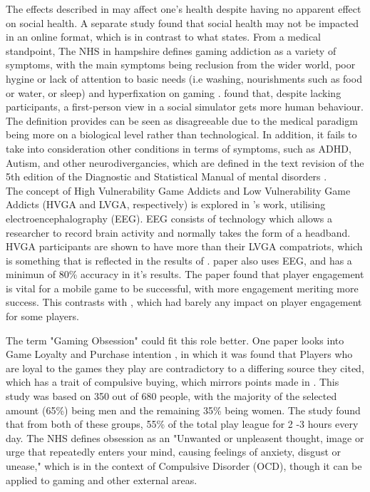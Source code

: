 \documentclass[conference]{IEEEtran}
\begin{document}
The effects described in \cite{Rahman2021} may affect one's health despite having no apparent effect on social health. A separate study \cite{Schlagowski2024} found that social health may not be impacted in an online format, which is in contrast to what \cite{NHSHamp24} states. From a medical standpoint, The NHS in hampshire defines gaming addiction as a variety of symptoms, with the main symptoms being reclusion from the wider world, poor hygine or lack of attention to basic needs (i.e washing, nourishments such as food or water, or sleep) and hyperfixation on gaming \cite{NHSHamp24}. \cite{Schlagowski2024} found that, despite lacking participants, a first-person view in a social simulator gets more human behaviour. The definition \cite{NHSHamp24} provides can be seen as disagreeable due to the medical paradigm being more on a biological level rather than technological. In addition, it fails to take into consideration other conditions in terms of symptoms, such as ADHD, Autism, and other neurodivergancies, which are defined in the text revision of the 5th edition of the Diagnostic and Statistical Manual of mental disorders \cite{Association2022}.\\

The concept of High Vulnerability Game Addicts and Low Vulnerability Game Addicts (HVGA and LVGA, respectively) is explored in \cite{Jing2024}'s work, utilising electroencephalography (EEG). EEG consists of technology which allows a researcher to record brain activity and normally takes the form of a headband. HVGA participants are shown to have more than their LVGA compatriots, which is something that is reflected in the results of \cite{Naaj2021}. \cite{Ruqeyya2022} paper also uses EEG, and has a minimun of 80\%  accuracy in it's results. The paper found that player engagement is vital for a mobile game to be successful, with more engagement meriting more success. This contrasts with \cite{Schlagowski2024}, which had barely any impact on player engagement for some players.

The term "Gaming Obsession" could fit this role better. One paper looks into Game Loyalty and Purchase intention \cite{Ramli2022}, in which it was found that Players who are loyal to the games they play are contradictory to a differing source they cited\cite{Widodo2020}, which has a trait of compulsive buying, which mirrors points made in \cite{yasir2021}.  This study was based on 350 out of 680 people, with the majority of the selected amount (65\%) being men and the remaining 35\% being women. The study found that from both of these groups, 55\% of the total play league for 2 -3 hours every day. The NHS  \cite{NHS2021} defines obsession as an "Unwanted or unpleasent thought, image or urge that repeatedly enters your mind, causing feelings of anxiety, disgust or unease," which is in the context of Compulsive Disorder (OCD), though it can be applied to gaming and other external areas.\\
\end{document}
